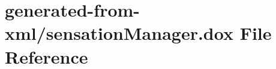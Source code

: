 \hypertarget{sensationManager_8dox}{}\section{generated-\/from-\/xml/sensation\+Manager.dox File Reference}
\label{sensationManager_8dox}

